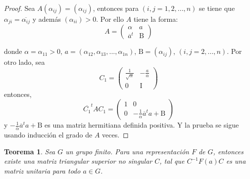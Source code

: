 \documentclass[12pt]{book}
\newtheorem{theorem}{Teorema}[section]
\theoremstyle{definition}
\newcounter{in}
\newcounter{ini}
\begin{document}
\begin{proof}
  Sea $A\left(\alpha_{ij}\right)=(\alpha_{ij})$, entonces para
  $\left(i,j=1,2,...,n\right)$ se tiene que
  $\alpha_{ji}=\overline{\alpha_{ij}}$ y además
  $\left(\alpha_{ii}\right)>0$. Por ello $A$ tiene la forma:
  \begin{equation}
    \label{eq:2}
     A=
     \begin{pmatrix}
    \alpha & a \\ 
    \overline{a}^{t} & \mathrm{B}
  \end{pmatrix}
  \end{equation} 

  donde $\alpha=\alpha_{11}>0$,
  $ a= \left(\alpha_{12},\alpha_{13},...,\alpha_{1n} \right) $,
  $ \mathrm{B}=\left(\alpha_{ij}\right)$,
  $ \left(i,j=2,...,n\right) $. Por otro lado, sea
\begin{equation}
  \label{eq:3}
  C_{1}=
  \begin{pmatrix}
    \frac{1}{\sqrt{\alpha}} & -\frac{a}{\alpha} \\ 
    0 & \mathrm{I}
  \end{pmatrix}
\end{equation}
entonces, 
\begin{equation}
   \label{eq:4}
  \overline{C_{1}}^{t}AC_{1} =
  \begin{pmatrix}
    1 & 0 \\ 
    0 & -\frac{1}{\alpha}\overline{a}^{t}a+\mathrm{B}
  \end{pmatrix}
\end{equation}  
y $-\frac{1}{\alpha}\overline{a}^{t}a+\mathrm{B}$ es una matriz
hermitiana definida positiva. Y la prueba se sigue usando inducción el
grado de $A$ veces.
\end{proof}

\begin{theorem}
  \label{t2_3}
  Sea $G$ un grupo finito. Para una representación $F$ de $G$,
  entonces existe una matriz triangular superior no singular $C$,
  tal que $C^{-1}F\left(a\right)C$ es una matriz unitaria para todo
  $a \in G$.
\end{theorem}
\end{document}
